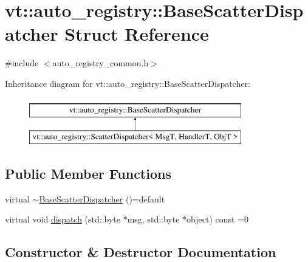 \hypertarget{structvt_1_1auto__registry_1_1_base_scatter_dispatcher}{}\section{vt\+:\+:auto\+\_\+registry\+:\+:Base\+Scatter\+Dispatcher Struct Reference}
\label{structvt_1_1auto__registry_1_1_base_scatter_dispatcher}


{\ttfamily \#include $<$auto\+\_\+registry\+\_\+common.\+h$>$}

Inheritance diagram for vt\+:\+:auto\+\_\+registry\+:\+:Base\+Scatter\+Dispatcher\+:\begin{figure}[H]
\begin{center}
\leavevmode
\includegraphics[height=2.000000cm]{structvt_1_1auto__registry_1_1_base_scatter_dispatcher}
\end{center}
\end{figure}
\subsection*{Public Member Functions}
\begin{DoxyCompactItemize}
\item 
virtual \hyperlink{structvt_1_1auto__registry_1_1_base_scatter_dispatcher_a9472bb7f39271247cea892d3b0d94612}{$\sim$\+Base\+Scatter\+Dispatcher} ()=default
\item 
virtual void \hyperlink{structvt_1_1auto__registry_1_1_base_scatter_dispatcher_a73e838ab5c74e75c304dca8987d8971f}{dispatch} (std\+::byte $\ast$msg, std\+::byte $\ast$object) const =0
\end{DoxyCompactItemize}


\subsection{Constructor \& Destructor Documentation}
\mbox{\label{structvt_1_1auto__registry_1_1_base_scatter_dispatcher_a9472bb7f39271247cea892d3b0d94612}} 
